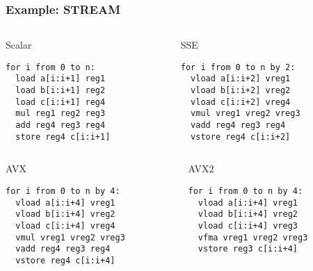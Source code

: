 \documentclass[dvipsnames,presentation,aspectratio=169,14pt]{beamer}
\begin{document}
\begin{frame}[fragile]
  \frametitle{Example: STREAM}
  \vskip -20pt
  \begin{columns}[t]
    \begin{column}{0.4\textwidth}
      \begin{block}{\footnotesize Scalar}
        \vspace{-5pt}
\begin{verbatim}
for i from 0 to n:
  load a[i:i+1] reg1
  load b[i:i+1] reg2
  load c[i:i+1] reg4
  mul reg1 reg2 reg3
  add reg4 reg3 reg4
  store reg4 c[i:i+1]
\end{verbatim}
        \vspace{-5pt}
      \end{block}
    \end{column}
    \begin{column}{0.4\textwidth}
      \begin{block}{\footnotesize SSE}
        \vspace{-5pt}
\begin{verbatim}
for i from 0 to n by 2:
  vload a[i:i+2] vreg1
  vload b[i:i+2] vreg2
  vload c[i:i+2] vreg4
  vmul vreg1 vreg2 vreg3
  vadd reg4 reg3 reg4
  vstore reg4 c[i:i+2]
\end{verbatim}
        \vspace{-5pt}
      \end{block}
    \end{column}
  \end{columns}
  \vspace{-5pt}
\begin{columns}[t]
  \begin{column}{0.4\textwidth}
    \begin{block}{\footnotesize AVX}
      \vspace{-5pt}
\begin{verbatim}
for i from 0 to n by 4:
  vload a[i:i+4] vreg1
  vload b[i:i+4] vreg2
  vload c[i:i+4] vreg4
  vmul vreg1 vreg2 vreg3
  vadd reg4 reg3 reg4
  vstore reg4 c[i:i+4]
\end{verbatim}
      \vspace{-5pt}
      \end{block}
    \end{column}
    \begin{column}{0.4\textwidth}
      \begin{block}{\footnotesize AVX2}
        \vspace{-5pt}
\begin{verbatim}
for i from 0 to n by 4:
  vload a[i:i+4] vreg1
  vload b[i:i+4] vreg2
  vload c[i:i+4] vreg3
  vfma vreg1 vreg2 vreg3
  vstore reg3 c[i:i+4]
\end{verbatim}
        \vspace{-5pt}
      \end{block}
    \end{column}
  \end{columns}
\end{frame}
\end{document}
